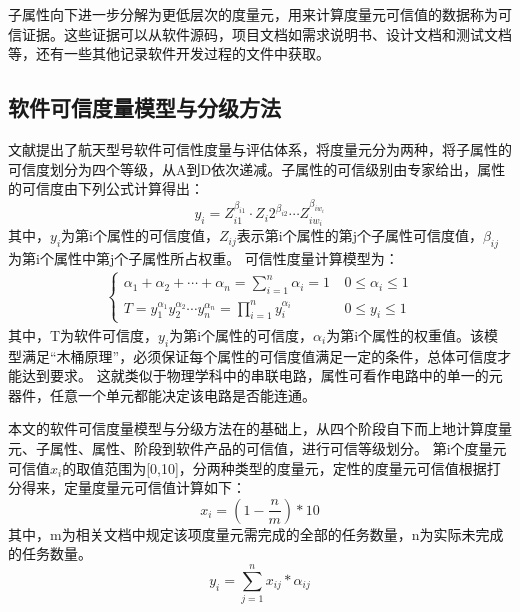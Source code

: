 子属性向下进一步分解为更低层次的度量元，用来计算度量元可信值的数据称为可信证据。这些证据可以从软件源码，项目文档如需求说明书、设计文档和测试文档等，还有一些其他记录软件开发过程的文件中获取\cite{王德鑫2018支持软件过程可信评估的可信证据}。

\subsection{软件可信度量模型与分级方法}
文献\cite{王婧2015航天嵌入式软件可信性度量方法及应用研究}提出了航天型号软件可信性度量与评估体系，将度量元分为两种，将子属性的可信度划分为四个等级，从A到D依次递减。子属性的可信级别由专家给出，属性的可信度由下列公式计算得出：
\begin{equation}
y_i=Z_{i1}^{\beta_{i1}}\cdot Z_i2^{\beta_{i2}}\cdots Z_{i{w_i}}^{\beta_{i{w_i}}}
\end{equation}
其中，$y_i$为第i个属性的可信度值，$Z_{ij}$表示第i个属性的第j个子属性可信度值，$\beta_{ij}$为第i个属性中第j个子属性所占权重。
可信性度量计算模型为：
\begin{align}
\left\{
\begin{array}{lr}
\alpha_1+\alpha_2+\cdots +\alpha_n = \sum_{i=1}^n \alpha_i = 1 ~& 0 \leq \alpha_i \leq 1\\
T=y_1^{\alpha_1}y_2^{\alpha_2}\cdots y_n^{\alpha_n}=\prod_{i=1}^n y_i^{\alpha_i} ~& 0\leq y_i \leq 1
\end{array}
\right.
\end{align}
其中，T为软件可信度，$y_i$为第i个属性的可信度，$\alpha_i$为第i个属性的权重值。该模型满足“木桶原理”，必须保证每个属性的可信度值满足一定的条件，总体可信度才能达到要求。
这就类似于物理学科中的串联电路，属性可看作电路中的单一的元器件，任意一个单元都能决定该电路是否能连通。

本文的软件可信度量模型与分级方法在\cite{王婧2015航天嵌入式软件可信性度量方法及应用研究,伍志强2019基于可信证据的软件可信性计算模型设计与工具实现}的基础上，从四个阶段自下而上地计算度量元、子属性、属性、阶段到软件产品的可信值，进行可信等级划分。
第i个度量元可信值$x_i$的取值范围为[0,10]，分两种类型的度量元，定性的度量元可信值根据打分得来，定量度量元可信值计算如下：
\begin{equation}
    x_i=(1-\frac{n}{m})*10
\end{equation}
其中，m为相关文档中规定该项度量元需完成的全部的任务数量，n为实际未完成的任务数量。
\begin{equation}
    y_i=\sum_{j=1}^n x_{ij}*{\alpha_{ij}} \label{formula:zishuxingkexinzhi}
\end{equation}

